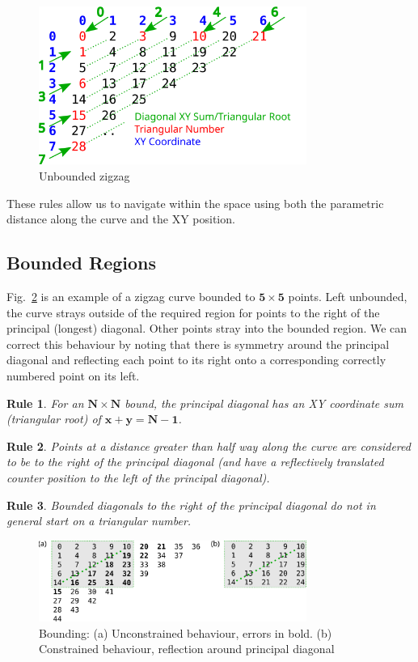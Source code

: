 \documentclass[10pt]{article}
\theoremstyle{theorem}
\newtheorem{theorem}{Rule} %
\begin{document}
\begin{figure}[h]
  \centering
  \includegraphics[width=3.45in]{zz_infinite}
  \caption{Unbounded zigzag}
  \label{fig:infinite}
\end{figure}

These rules allow us to navigate within the space using both the parametric
distance along the curve and the XY position.

\subsection{Bounded Regions}

Fig.~\ref{fig:bounded} is an example of a zigzag curve bounded to
$\mathbf{5\times5}$ points.  Left unbounded, the curve strays outside of the
required region for points to the right of the principal (longest) diagonal.
Other points stray into the bounded region. We can correct this behaviour by
noting that there is symmetry around the principal diagonal and reflecting each
point to its right onto a corresponding correctly numbered point on its left.

\begin{theorem} \label{thm:principaldiag}
  For an $\mathbf{N \times N}$ bound, the principal diagonal has an XY
  coordinate sum (triangular root) of $\mathbf{x+y=N-1}$.
\end{theorem}
\begin{theorem} \label{thm:curvemidpoint}
  Points at a distance greater than half way along the curve are considered to
  be to the right of the principal diagonal (and have a reflectively translated
  counter position to the left of the principal diagonal).
\end{theorem}
\begin{theorem} \label{thm:boundednontri}
  Bounded diagonals to the right of the principal diagonal do not in general
  start on a triangular number.
\end{theorem}

\begin{figure}[h]
  \centering
  \includegraphics[width=3.45in]{zz_bounded}
  \caption{Bounding: (a) Unconstrained behaviour, errors in bold. (b)
  Constrained behaviour, reflection around principal diagonal}
  \label{fig:bounded}
\end{figure}
\end{document}
